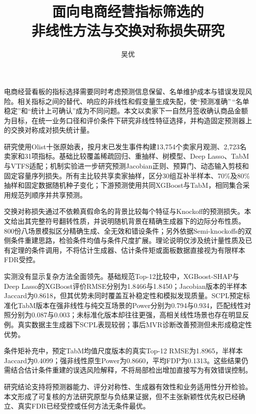 \documentclass{sufethesismas}
\begin{document}
\classification{}\confidential{}\UDC{}\serialnumber{}
\title{面向电商经营指标筛选的\\非线性方法与交换对称损失研究}
\author{吴优}
\maketitle
\frontmatter
\begin{abstractCN}电商经营看板的指标选择需要同时考虑预测信息保留、名单维护成本与错误发现风险。相关指标之间的替代、响应的非线性和假变量生成失配，使``预测准确''\,``名单稳定''和``统计上可确认''成为不同问题。本文以卖家下一自然月签收确认商品金额为目标，在统一业务口径和评价条件下研究非线性特征选择，并构造固定预测器上的交换对称成对损失统计量。

研究使用Olist十张原始表，按月末已发生事件构建13,754个卖家月观测、2,723名卖家和31项指标。基础比较覆盖稀疏回归、重抽样、树模型、Deep Lasso、TabM与VTFS适配；机制实验进一步研究预测Jacobian正则、预算门、动态输入剪枝和固定容量序列损失。所有主比较共享卖家抽样，区分30组互补半样本、70\%及80\%抽样和固定数据随机种子变化；下游预测使用共同XGBoost与TabM，相同集合采用规范列顺序并共享预测。

交换对称损失通过不依赖真假命名的背景比较每个特征与Knockoff的预测损失。本文给出其完整符号翻转性质，并说明随机背景在精确生成器下的边际分布性质。800份八场景模拟区分精确生成、全无效和错设条件；另外依据Semi-knockoffs的双侧条件重建思路，检验条件均值与条件尺度扩展。理论说明仅涉及统计量性质及已有定理的条件调用，不将估计生成器、估计条件矩或面板数据直接视为有限样本FDR受控。

实测没有显示复杂方法全面领先。基础规范Top-12比较中，XGBoost-SHAP与Deep Lasso的XGBoost评价RMSE分别为1.8466与1.8450；Jacobian版本的半样本Jaccard为0.8618，但其优势未同时覆盖互补稳定性和模拟发现质量。SCPL预定标准化TabM版本在强非线性与纯交互场景的Power分别为0.794与0.934，匹配线性对照分别为0.087与0.003；未标准化版本却往往更强，高相关线性场景也存在明显反例。真实数据主生成器下SCPL表现较弱；事后MVR诊断改善预测但未形成稳定性优势。

条件矩补充中，预定TabM均值尺度版本的真实Top-12 RMSE为1.8965，半样本Jaccard为0.4099；强非线性原生Power为0.8660，平均FDP为0.1313。这些结果仍需结合估计条件重建的误选风险解释，不将局部检出增加直接写为有效错误控制。

研究结论支持将预测器能力、评分对称性、生成器有效性和业务适用性分开检验。本文形成了可复核的方法研究原型与负结果证据，但不主张新颖性优先权已经确立、真实FDR已经受控或任何方法无条件最优。
\end{abstractCN}
\end{document}
